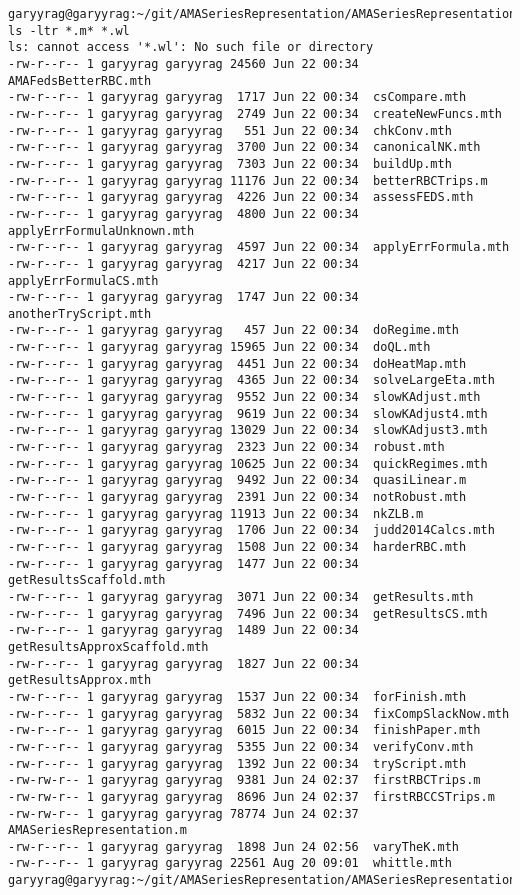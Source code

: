 \documentclass[hyperref,idxtotoc]{labbook}
\begin{document}
\begin{verbatim}
garyyrag@garyyrag:~/git/AMASeriesRepresentation/AMASeriesRepresentation$ ls -ltr *.m* *.wl
ls: cannot access '*.wl': No such file or directory
-rw-r--r-- 1 garyyrag garyyrag 24560 Jun 22 00:34  AMAFedsBetterRBC.mth
-rw-r--r-- 1 garyyrag garyyrag  1717 Jun 22 00:34  csCompare.mth
-rw-r--r-- 1 garyyrag garyyrag  2749 Jun 22 00:34  createNewFuncs.mth
-rw-r--r-- 1 garyyrag garyyrag   551 Jun 22 00:34  chkConv.mth
-rw-r--r-- 1 garyyrag garyyrag  3700 Jun 22 00:34  canonicalNK.mth
-rw-r--r-- 1 garyyrag garyyrag  7303 Jun 22 00:34  buildUp.mth
-rw-r--r-- 1 garyyrag garyyrag 11176 Jun 22 00:34  betterRBCTrips.m
-rw-r--r-- 1 garyyrag garyyrag  4226 Jun 22 00:34  assessFEDS.mth
-rw-r--r-- 1 garyyrag garyyrag  4800 Jun 22 00:34  applyErrFormulaUnknown.mth
-rw-r--r-- 1 garyyrag garyyrag  4597 Jun 22 00:34  applyErrFormula.mth
-rw-r--r-- 1 garyyrag garyyrag  4217 Jun 22 00:34  applyErrFormulaCS.mth
-rw-r--r-- 1 garyyrag garyyrag  1747 Jun 22 00:34  anotherTryScript.mth
-rw-r--r-- 1 garyyrag garyyrag   457 Jun 22 00:34  doRegime.mth
-rw-r--r-- 1 garyyrag garyyrag 15965 Jun 22 00:34  doQL.mth
-rw-r--r-- 1 garyyrag garyyrag  4451 Jun 22 00:34  doHeatMap.mth
-rw-r--r-- 1 garyyrag garyyrag  4365 Jun 22 00:34  solveLargeEta.mth
-rw-r--r-- 1 garyyrag garyyrag  9552 Jun 22 00:34  slowKAdjust.mth
-rw-r--r-- 1 garyyrag garyyrag  9619 Jun 22 00:34  slowKAdjust4.mth
-rw-r--r-- 1 garyyrag garyyrag 13029 Jun 22 00:34  slowKAdjust3.mth
-rw-r--r-- 1 garyyrag garyyrag  2323 Jun 22 00:34  robust.mth
-rw-r--r-- 1 garyyrag garyyrag 10625 Jun 22 00:34  quickRegimes.mth
-rw-r--r-- 1 garyyrag garyyrag  9492 Jun 22 00:34  quasiLinear.m
-rw-r--r-- 1 garyyrag garyyrag  2391 Jun 22 00:34  notRobust.mth
-rw-r--r-- 1 garyyrag garyyrag 11913 Jun 22 00:34  nkZLB.m
-rw-r--r-- 1 garyyrag garyyrag  1706 Jun 22 00:34  judd2014Calcs.mth
-rw-r--r-- 1 garyyrag garyyrag  1508 Jun 22 00:34  harderRBC.mth
-rw-r--r-- 1 garyyrag garyyrag  1477 Jun 22 00:34  getResultsScaffold.mth
-rw-r--r-- 1 garyyrag garyyrag  3071 Jun 22 00:34  getResults.mth
-rw-r--r-- 1 garyyrag garyyrag  7496 Jun 22 00:34  getResultsCS.mth
-rw-r--r-- 1 garyyrag garyyrag  1489 Jun 22 00:34  getResultsApproxScaffold.mth
-rw-r--r-- 1 garyyrag garyyrag  1827 Jun 22 00:34  getResultsApprox.mth
-rw-r--r-- 1 garyyrag garyyrag  1537 Jun 22 00:34  forFinish.mth
-rw-r--r-- 1 garyyrag garyyrag  5832 Jun 22 00:34  fixCompSlackNow.mth
-rw-r--r-- 1 garyyrag garyyrag  6015 Jun 22 00:34  finishPaper.mth
-rw-r--r-- 1 garyyrag garyyrag  5355 Jun 22 00:34  verifyConv.mth
-rw-r--r-- 1 garyyrag garyyrag  1392 Jun 22 00:34  tryScript.mth
-rw-rw-r-- 1 garyyrag garyyrag  9381 Jun 24 02:37  firstRBCTrips.m
-rw-rw-r-- 1 garyyrag garyyrag  8696 Jun 24 02:37  firstRBCCSTrips.m
-rw-rw-r-- 1 garyyrag garyyrag 78774 Jun 24 02:37  AMASeriesRepresentation.m
-rw-r--r-- 1 garyyrag garyyrag  1898 Jun 24 02:56  varyTheK.mth
-rw-r--r-- 1 garyyrag garyyrag 22561 Aug 20 09:01  whittle.mth
garyyrag@garyyrag:~/git/AMASeriesRepresentation/AMASeriesRepresentation$ 
\end{verbatim}
\end{document}
